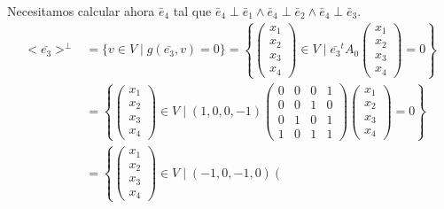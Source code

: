 \begin{ejercicio}
\begin{enumerate}
\begin{itemize}
            Necesitamos calcular ahora $\bar{e}_4$ tal que $ \bar{e}_4\perp \bar{e}_1 \land \bar{e}_4\perp \bar{e}_2 \land \bar{e}_4\perp \bar{e}_3$.
            \begin{equation*}\begin{split}
                <\bar{e_3}>^\perp &= \{v \in V \mid g(\bar{e_3},v) = 0\} 
                = \left\{ \left(\begin{array}{c}
                     x_1 \\ x_2 \\ x_3 \\ x_4
                \end{array} \right) \in V \mid \bar{e_3}^t A_0
                \left(\begin{array}{c}
                     x_1 \\ x_2 \\ x_3 \\x_4
                \end{array} \right) = 0\right\} \\
                &= \left\{ \left(\begin{array}{c}
                     x_1 \\ x_2 \\ x_3 \\ x_4
                \end{array} \right) \in V \mid (1, 0, 0, -1) \left(\begin{array}{cccc}
                    0 & 0 & 0 & 1 \\
                    0 & 0 & 1 & 0 \\
                    0 & 1 & 0 & 1 \\
                    1 & 0 & 1 & 1
                \end{array} \right) 
                \left(\begin{array}{c}
                     x_1 \\ x_2 \\ x_3 \\x_4
                \end{array} \right) = 0\right\} \\
                &= \left\{ \left(\begin{array}{c}
                     x_1 \\ x_2 \\ x_3 \\x_4
                \end{array} \right) \in V \mid (-1, 0, -1, 0)
                \left(\begin{array}{c}

\end{array}
\end{split}
\end{equation*}
\end{itemize}
\end{enumerate}
\end{ejercicio}
